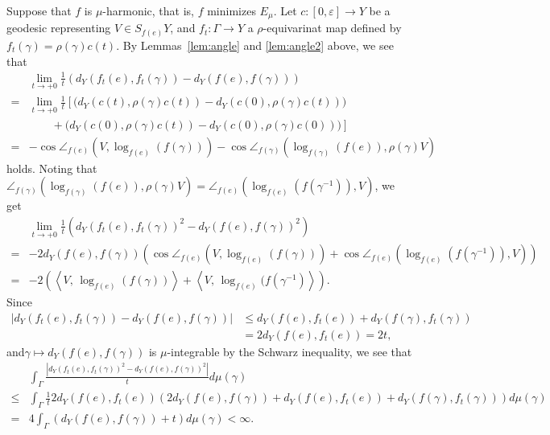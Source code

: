 \documentclass[12pt]{amsart}
\numberwithin{equation}{section}
\theoremstyle{plain}
\theoremstyle{definition}
\theoremstyle{remark}
\newcommand{\tcprj}{\log}
\newcommand{\inner}[2]{\left\langle #1,\, #2 \right\rangle}
\begin{document}
 Suppose that $f$ is $\mu$-harmonic, that is, $f$ minimizes $E_{\mu}$. 
 Let $c\colon [0,\varepsilon]\rightarrow Y$ be a geodesic representing
 $V \in S_{f(e)}Y$, and $f_t\colon \Gamma \rightarrow Y$ a
 $\rho$-equivarinat map defined by 
 $f_t(\gamma)= \rho(\gamma) c(t)$. 
 By Lemmas~\ref{lem:angle} and \ref{lem:angle2} above, we see that 
\begin{equation*}
\begin{split}
  & \lim_{t\to +0} \frac{1}{t} 
 \left( d_Y(f_t(e),f_t(\gamma))- d_Y(f(e),f(\gamma)) \right) \\
 = & \lim_{t\to +0} \frac{1}{t}\left[\big(d_Y(c(t),\rho(\gamma)c(t))
       -d_Y(c(0),\rho(\gamma)c(t))\big) \right. \\
  & \phantom{++}
    + \left. \big(d_Y(c(0),\rho(\gamma)c(t)) 
      -d_Y(c(0),\rho(\gamma)c(0)) \big)\right] \\
 =&  -\cos \angle_{f(e)}(V, \tcprj_{f(e)}(f(\gamma)))
   -\cos \angle_{f(\gamma)}(\tcprj_{f(\gamma)}(f(e)),\rho(\gamma)V)
\end{split}
\end{equation*}
holds. Noting that 
$\angle_{f(\gamma)}(\tcprj_{f(\gamma)}(f(e)),\rho(\gamma)V)=
 \angle_{f(e)}(\tcprj_{f(e)}(f(\gamma^{-1})),V)$, 
we get
\begin{equation*}
\begin{split}
 & \lim_{t\to +0} \frac{1}{t} \left(
 d_Y(f_t(e),f_t(\gamma))^2-d_Y(f(e),f(\gamma))^2 \right) \\
 = & -2 d_Y(f(e),f(\gamma)) \left(
   \cos \angle_{f(e)}(V, \tcprj_{f(e)}(f(\gamma)))
   + \cos\angle_{f(e)}(\tcprj_{f(e)}(f(\gamma^{-1})),V)
  \right) \\
 = & -2\left(\inner{V}{\tcprj_{f(e)}(f(\gamma))} 
    + \inner{V}{\tcprj_{f(e)}(f(\gamma^{-1})}\right). 
\end{split}
\end{equation*}
 Since
\begin{equation*}
\begin{split}
   |d_Y(f_t(e),f_t(\gamma)) - d_Y(f(e),f(\gamma))|
 & \leq  d_Y(f(e),f_t(e)) + d_Y(f(\gamma),f_t(\gamma)) \\
 & =  2d_Y(f(e),f_t(e))=2t, 
\end{split}
\end{equation*}
 and$\gamma\mapsto d_Y(f(e),f(\gamma))$ is $\mu$-integrable by the
 Schwarz inequality, we see that
\begin{equation*}
\begin{split}
  & \int_{\Gamma}\frac{|d_Y(f_t(e),f_t(\gamma))^2
         -d_Y(f(e),f(\gamma))^2|}{t}   d\mu(\gamma) \\
 \leq & \int_{\Gamma} \frac{1}{t }2d_Y(f(e),f_t(e))
 \left(2d_Y(f(e),f(\gamma)) + d_Y(f(e),f_t(e)) 
       + d_Y(f(\gamma),f_t(\gamma))\right) d\mu(\gamma) \\
 = & 4 \int_{\Gamma} \left(d_Y(f(e),f(\gamma)) + t\right)
 d\mu(\gamma) < \infty. 
\end{split}
\end{equation*}
\end{document}

